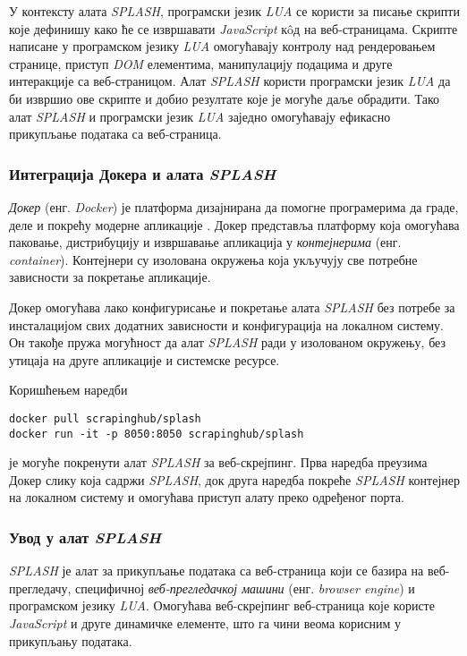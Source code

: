 \documentclass[12pt,oneside]{memoir}
\begin{document}
У контексту алата \textit{SPLASH}, програмски језик \textit{LUA} се користи за писање скрипти које дефинишу како ће се извршавати \textit{JavaScript} кôд на веб-страницама. Скрипте написане у програмском језику \textit{LUA} омогућавају контролу над рендеровањем странице, приступ \textit{DOM} елементима, манипулацију подацима и друге интеракције са веб-страницом. Алат \textit{SPLASH} користи програмски језик \textit{LUA} да би извршио ове скрипте и добио резултате које је могуће даље обрадити. Тако алат \textit{SPLASH} и програмски језик \textit{LUA} заједно омогућавају ефикасно прикупљање података са веб-страница.

\subsubsection{Интеграција Докера и алата \textit{SPLASH}}
\emph{Докер} (енг. \textit{Docker}) је платформа дизајнирана да помогне програмерима да граде, деле и покрећу модерне апликације \cite{docker}. Докер представља платформу која омогућава паковање, дистрибуцију и извршавање апликација у \emph{контејнерима} (енг. \textit{container}). Контејнери су изолована окружења која укључују све потребне зависности за покретање апликације.

Докер омогућава лако конфигурисање и покретање алата \textit{SPLASH} без потребе за инсталацијом свих додатних зависности и конфигурација на локалном систему. Он такође пружа могућност да алат \textit{SPLASH} ради у изолованом окружењу, без утицаја на друге апликације и системске ресурсе.

Коришћењем наредби 
\begin{verbatim}
docker pull scrapinghub/splash
docker run -it -p 8050:8050 scrapinghub/splash  
\end{verbatim}
је могуће покренути алат \textit{SPLASH} за веб-скрејпинг. Прва наредба преузима Докер слику која садржи \textit{SPLASH}, док друга наредба покреће \textit{SPLASH} контејнер на локалном систему и омогућава приступ алату преко одређеног порта.

\subsubsection{Увод у алат \textit{SPLASH}}
\textit{SPLASH} је алат за прикупљање података са веб-страница који се базира на веб-прегледачу, специфичној \emph{веб-прегледачкој машини} (енг. \textit{browser engine}) и програмском језику \textit{LUA}. Омогућава веб-скрејпинг веб-страница које користе \textit{JavaScript} и друге динамичке елементе, што га чини веома корисним у прикупљању података.
\end{document}
